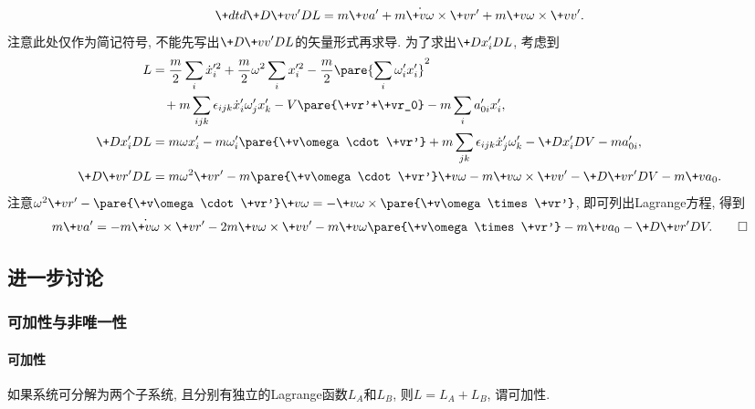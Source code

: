 \documentclass{ctexart}
\begin{document}
\begin{sample}
\begin{ex}
        \[ \+dtd{}\+D{\+vv'}D{L} = m\+va' + m\dot{\+v\omega}\times\+vr' + m\+v\omega\times\+vv'. \]
        注意此处仅作为简记符号, 不能先写出$\displaystyle \+D{\+vv'}D{L}$的矢量形式再求导. 为了求出$\displaystyle \+D{x'_i}D{L}$, 考虑到
        \begin{align*}
            L &= \frac{m}{2}\sum_i \dot{x}'^2_i + \frac{m}{2}\omega^2\sum_i x'^2_i - \frac{m}{2}\pare{\sum_i \omega'_i x'_i}^2  \\
            &\phantom{=}\, + m\sum_{ijk} \epsilon_{ijk} \dot{x}'_i\omega'_jx'_k - V\pare{\+vr'+\+vr_0} - m\sum_i a'_{0i}x'_i,\\
            \displaystyle \+D{x'_i}D{L} &= m\omega x'_i - m\omega'_i\pare{\+v\omega\cdot\+vr'} + m\sum_{jk} \epsilon_{ijk} \dot{x}'_j \omega'_k - \+D{x'_i}DV - ma'_{0i},\\
            \+D{\+vr'}DL &= m\omega^2 \+vr' - m\pare{\+v\omega\cdot\+vr'}\+v\omega - m\+v\omega\times\+vv' - \+D{\+vr'}D{V} - m\+va_0.
        \end{align*}
        注意$\omega^2\+vr' - \pare{\+v\omega\cdot\+vr'}\+v\omega = -\+v\omega\times\pare{\+v\omega\times\+vr'}$, 即可列出Lagrange方程, 得到
        \[ m\+va' = -m\dot{\+v\omega}\times\+vr' - 2m\+v\omega\times\+vv' - m\+v\omega\pare{\+v\omega\times \+vr'} - m\+va_0 - \+D{\+vr'}D{V}.\qedhere \]
    \end{ex}
\end{sample}



\subsection{进一步讨论} %
\label{sub:进一步讨论}

\subsubsection{可加性与非唯一性} %
\label{ssub:可加性与非唯一性}

\paragraph{可加性} %
\label{par:可加性}

如果系统可分解为两个子系统, 且分别有独立的Lagrange函数$L_A$和$L_B$, 则$L = L_A+L_B$, 谓可加性.

\end{document}
